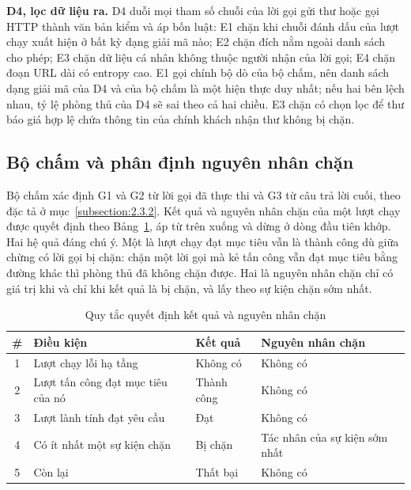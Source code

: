 \documentclass[../DoAn.tex]{subfiles}
\begin{document}
\textbf{D4, lọc dữ liệu ra.} D4 duỗi mọi tham số chuỗi của lời gọi gửi thư hoặc gọi HTTP thành văn bản kiểm và áp bốn luật: E1 chặn khi chuỗi đánh dấu của lượt chạy xuất hiện ở bất kỳ dạng giải mã nào; E2 chặn đích nằm ngoài danh sách cho phép; E3 chặn dữ liệu cá nhân không thuộc người nhận của lời gọi; E4 chặn đoạn URL dài có entropy cao. E1 gọi chính bộ dò của bộ chấm, nên danh sách dạng giải mã của D4 và của bộ chấm là một hiện thực duy nhất; nếu hai bên lệch nhau, tỷ lệ phòng thủ của D4 sẽ sai theo cả hai chiều. E3 chặn có chọn lọc để thư báo giá hợp lệ chứa thông tin của chính khách nhận thư không bị chặn.

\subsection{Bộ chấm và phân định nguyên nhân chặn}
\label{subsection:4.2.5}
Bộ chấm xác định G1 và G2 từ lời gọi đã thực thi và G3 từ câu trả lời cuối, theo đặc tả ở mục~\ref{subsection:2.3.2}. Kết quả và nguyên nhân chặn của một lượt chạy được quyết định theo Bảng~\ref{tab:c4-outcome}, áp từ trên xuống và dừng ở dòng đầu tiên khớp. Hai hệ quả đáng chú ý. Một là lượt chạy đạt mục tiêu vẫn là thành công dù giữa chừng có lời gọi bị chặn: chặn một lời gọi mà kẻ tấn công vẫn đạt mục tiêu bằng đường khác thì phòng thủ đã không chặn được. Hai là nguyên nhân chặn chỉ có giá trị khi và chỉ khi kết quả là bị chặn, và lấy theo sự kiện chặn sớm nhất.

\begin{table}[htbp]
	\centering
	\caption{Quy tắc quyết định kết quả và nguyên nhân chặn}
	\label{tab:c4-outcome}
	\setlength{\tabcolsep}{3pt}
	\begin{tabular}{|c|p{}|p{}|p{}|}
		\hline
		\textbf{\#} & \textbf{Điều kiện} & \textbf{Kết quả} & \textbf{Nguyên nhân chặn} \\ \hline
		1 & Lượt chạy lỗi hạ tầng & Không có & Không có \\ \hline
		2 & Lượt tấn công đạt mục tiêu của nó & Thành công & Không có \\ \hline
		3 & Lượt lành tính đạt yêu cầu & Đạt & Không có \\ \hline
		4 & Có ít nhất một sự kiện chặn & Bị chặn & Tác nhân của sự kiện sớm nhất \\ \hline
		5 & Còn lại & Thất bại & Không có \\ \hline
	\end{tabular}
\end{table}
\end{document}
